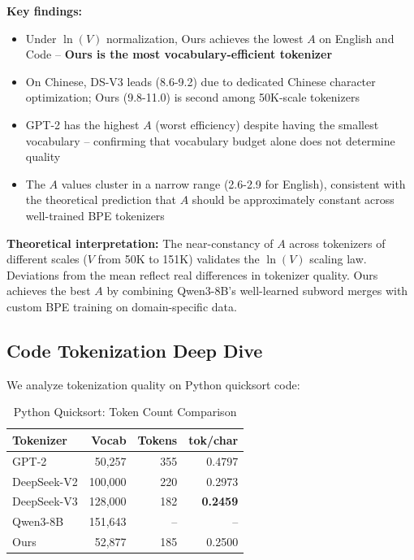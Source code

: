 \textbf{Key findings:}
\begin{itemize}
    \item Under $\ln(V)$ normalization, Ours achieves the lowest $A$ on English and Code -- \textbf{Ours is the most vocabulary-efficient tokenizer}
    \item On Chinese, DS-V3 leads (8.6-9.2) due to dedicated Chinese character optimization; Ours (9.8-11.0) is second among 50K-scale tokenizers
    \item GPT-2 has the highest $A$ (worst efficiency) despite having the smallest vocabulary -- confirming that vocabulary budget alone does not determine quality
    \item The $A$ values cluster in a narrow range (2.6-2.9 for English), consistent with the theoretical prediction that $A$ should be approximately constant across well-trained BPE tokenizers
\end{itemize}

\textbf{Theoretical interpretation:} The near-constancy of $A$ across tokenizers of different scales ($V$ from 50K to 151K) validates the $\ln(V)$ scaling law. Deviations from the mean reflect real differences in tokenizer quality. Ours achieves the best $A$ by combining Qwen3-8B's well-learned subword merges with custom BPE training on domain-specific data.

\subsection{Code Tokenization Deep Dive}

We analyze tokenization quality on Python quicksort code:

\begin{table}[h]
    \centering
    \caption{Python Quicksort: Token Count Comparison}
    \begin{tabular}{lrrr}
        \toprule
        \textbf{Tokenizer} & \textbf{Vocab} & \textbf{Tokens} & \textbf{tok/char} \\
        \midrule
        GPT-2 & 50,257 & 355 & 0.4797 \\
        DeepSeek-V2 & 100,000 & 220 & 0.2973 \\
        DeepSeek-V3 & 128,000 & 182 & \textbf{0.2459} \\
        Qwen3-8B & 151,643 & -- & -- \\
        Ours & 52,877 & 185 & 0.2500 \\
        \bottomrule
    \end{tabular}
\end{table}

